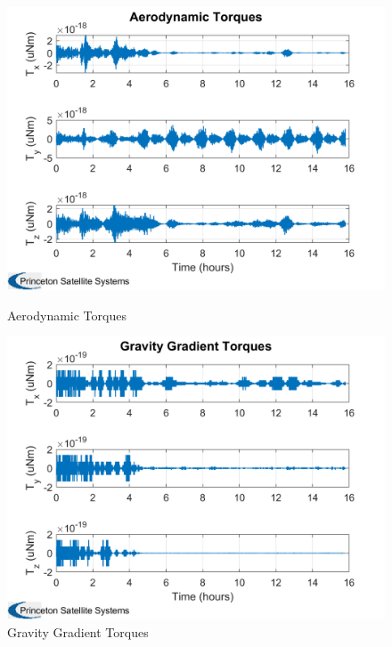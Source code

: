 \begin{itemize}
    \begin{figure}[H]
        \centering
        \begin{minipage}{0.48\linewidth}
            \centering
            \includegraphics[width=0.95\linewidth]{res/img/Nadir_EKF/Simulations/Aerodynamic Torques.png}
            \caption{Aerodynamic Torques}
        \end{minipage}\hfill
        \begin{minipage}{0.48\linewidth}
            \centering
            \includegraphics[width=0.95\linewidth]{res/img/Nadir_EKF/Simulations/Gravity Gradient Torques.png}
            \caption{Gravity Gradient Torques}
        \end{minipage}
    \end{figure}


\end{itemize}
